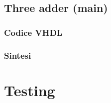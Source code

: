 \documentclass[12pt]{article}
\begin{document}
    \subsection{Three adder (main)}

        \subsubsection{Codice VHDL}
        
        \subsubsection{Sintesi}

\section{Testing}
\end{document}
